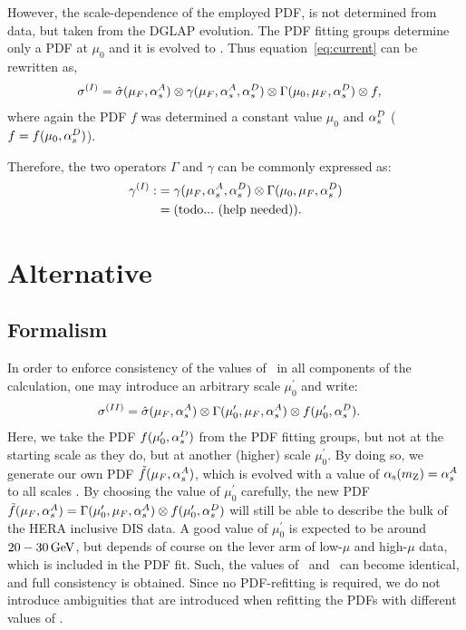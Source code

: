 \documentclass[12pt]{article}
\begin{document}
However, the scale-dependence of the employed PDF, is not determined from data, but taken from
the DGLAP evolution. 
The PDF fitting groups determine only a PDF at $\mu_0$ and it is evolved to \muf. Thus 
equation~\ref{eq:current} can be rewritten as,
\begin{align}
  \sigma^{(I)}  &= \hat\sigma(\mu_{F},\alpha_s^A) \otimes \gamma(\mu_{F},\alpha_s^A,\alpha_s^D) \otimes \Gamma(\mu_0,\mu_{F},\alpha_s^D) \otimes f,
\end{align}
where again the PDF $f$ was determined a constant value $\mu_0$ and $\alpha_s^D$ ($f=f(\mu_0,\alpha_s^D)$).

Therefore, the two operators $\Gamma$ and $\gamma$ can be commonly expressed as:
\begin{align}
  \gamma^{(I)} :&= \gamma(\mu_{F},\alpha_s^A,\alpha_s^D) \otimes \Gamma(\mu_0,\mu_{F},\alpha_s^D)\\
                &=  \rm(todo...~(help~needed)).
\end{align}




\section{Alternative}
\subsection{Formalism}
In order to enforce consistency of the values of \as\ in all components of the calculation, one may introduce
an arbitrary scale $\mu_0^\prime$ and write:
\begin{align}
  \sigma^{(II)} &= \hat\sigma(\mu_{F},\alpha_s^A) \otimes \Gamma(\mu_0^\prime,\mu_{F},\alpha_s^A) \otimes f(\mu_0^\prime,\alpha_s^D).
\label{eq:alternative}
\end{align}
Here, we take the PDF $f(\mu_0^\prime,\alpha_s^D)$ from the PDF fitting groups, but not at the starting scale as they do, but
at another (higher) scale $\mu_0^\prime$. By doing so, we generate our own PDF $\tilde{f}(\mu_{F},\alpha_s^A)$, which is evolved with a value of $\alpha_{\rm s}(m_{\rm Z})=\alpha_s^A$ to all scales \muf.
By choosing the value of $\mu_0^\prime$ carefully, the new PDF $\tilde{f}(\mu_{F},\alpha_s^A) = \Gamma(\mu_0^\prime,\mu_{F},\alpha_s^A) \otimes f(\mu_0^\prime,\alpha_s^D)$ 
will still be able to describe the bulk of the HERA inclusive DIS data.
A good value  of $\mu_0^\prime$ is expected to be around $20-30\,\mathrm{GeV}$, but depends of course
on the lever arm of low-$\mu$ and high-$\mu$ data, which is included in the PDF fit.
Such, the values of \asA\ and \asD\ can become identical, and full consistency is obtained.
Since no PDF-refitting is required, we do not introduce ambiguities that are introduced when 
refitting the PDFs with different values of \asD.
\end{document}
